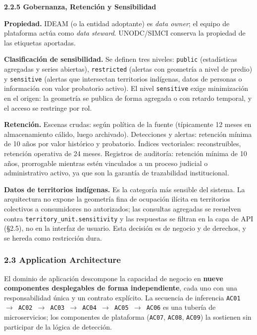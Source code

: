 \documentclass{article}
\newcommand{\mdhfour}[1]{\par\medskip\noindent\textbf{#1}\par\nobreak\smallskip}
\begin{document}
\mdhfour{2.2.5 Gobernanza, Retención y Sensibilidad}

\textbf{Propiedad.} IDEAM (o la entidad adoptante) es \emph{data owner}; el equipo de plataforma actúa como \emph{data steward}. UNODC/SIMCI conserva la propiedad de las etiquetas aportadas.

\textbf{Clasificación de sensibilidad.} Se definen tres niveles: \texttt{public} (estadísticas agregadas y series abiertas), \texttt{restricted} (alertas con geometría a nivel de predio) y \texttt{sensitive} (alertas que intersectan territorios indígenas, datos de personas o información con valor probatorio activo). El nivel \texttt{sensitive} exige minimización en el origen: la geometría se publica de forma agregada o con retardo temporal, y el acceso se restringe por rol.

\textbf{Retención.} Escenas crudas: según política de la fuente (típicamente 12 meses en almacenamiento cálido, luego archivado). Detecciones y alertas: retención mínima de 10 años por valor histórico y probatorio. Índices vectoriales: reconstruibles, retención operativa de 24 meses. Registros de auditoría: retención mínima de 10 años, prorrogable mientras estén vinculados a un proceso judicial o administrativo activo, ya que son la garantía de trazabilidad institucional.

\textbf{Datos de territorios indígenas.} Es la categoría más sensible del sistema. La arquitectura no expone la geometría fina de ocupación ilícita en territorios colectivos a consumidores no autorizados; las consultas agregadas se resuelven contra \texttt{territory\_\allowbreak{}unit.\allowbreak{}sensitivity} y las respuestas se filtran en la capa de API (\S{}2.5), no en la interfaz de usuario. Esta decisión es de negocio y de derechos, y se hereda como restricción dura.

\subsubsection{2.3 Application Architecture}

El dominio de aplicación descompone la capacidad de negocio en \textbf{nueve componentes desplegables de forma independiente}, cada uno con una responsabilidad única y un contrato explícito. La secuencia de inferencia \texttt{AC01 \ensuremath{\rightarrow} AC02 \ensuremath{\rightarrow} AC03 \ensuremath{\rightarrow} AC04 \ensuremath{\rightarrow} AC05 \ensuremath{\rightarrow} AC06} es una tubería de microservicios; los componentes de plataforma (\texttt{AC07}, \texttt{AC08}, \texttt{AC09}) la sostienen sin participar de la lógica de detección.
\end{document}
